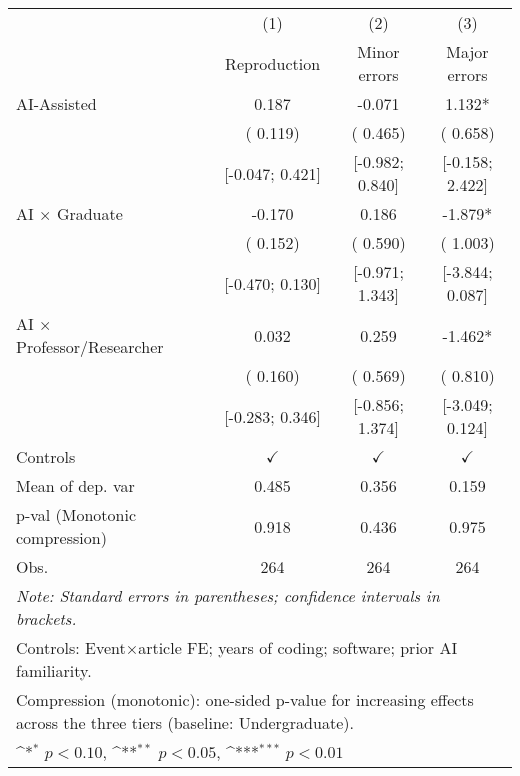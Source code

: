 \def\sym#1{\ifmmode^{#1}\else\(^{#1}\)\fi}
\begin{tabular}{l*{3}{c}}
\hline\hline
 & (1) & (2) & (3)
\\
 & Reproduction & Minor errors & Major errors
 \\
\hline
AI-Assisted &  0.187 & -0.071 &  1.132*
\\
 & ( 0.119) & ( 0.465) & ( 0.658)
\\
 & [-0.047;  0.421] & [-0.982;  0.840] & [-0.158;  2.422]
\\
AI × Graduate & -0.170 &  0.186 & -1.879*
\\
 & ( 0.152) & ( 0.590) & ( 1.003)
\\
 & [-0.470;  0.130] & [-0.971;  1.343] & [-3.844;  0.087]
\\
AI × Professor/Researcher &  0.032 &  0.259 & -1.462*
\\
 & ( 0.160) & ( 0.569) & ( 0.810)
\\
 & [-0.283;  0.346] & [-0.856;  1.374] & [-3.049;  0.124]
\\
\hline
Controls & $\checkmark$ & $\checkmark$ & $\checkmark$
\\
Mean of dep. var &  0.485 &  0.356 &  0.159
\\
p-val (Monotonic compression) &  0.918 &  0.436 &  0.975
\\
Obs. & 264 & 264 & 264
\\
\hline
\hline\hline
\multicolumn{4}{l}{\it{Note:} Standard errors in parentheses; confidence intervals in brackets.}\\
\multicolumn{4}{l}{Controls: Event×article FE; years of coding; software; prior AI familiarity.}\\
\multicolumn{4}{l}{Compression (monotonic): one-sided p-value for increasing effects across the three tiers (baseline: Undergraduate).}\\
\multicolumn{4}{l}{\sym{*} $p<0.10$, \sym{**} $p<0.05$,  \sym{***} $p<0.01$}\\
\end{tabular}
